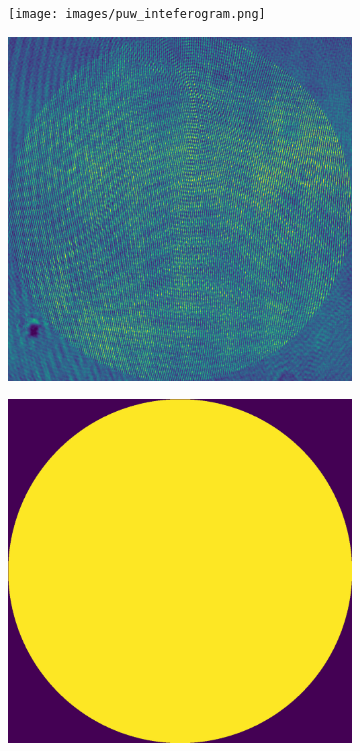 \begin{figure}
	\centering
	\begin{subfigure}{0.23\textwidth}
		\centering
		\texttt{[image: images/puw\_inteferogram.png]}
		\caption{}
		\label{fig:puw_inteferogram}
	\end{subfigure}
	\begin{subfigure}{0.23\textwidth}
		\centering
		\includegraphics[width=1\linewidth, scale=0.5]{images/puw_inteferogram_cropped.png}
		\caption{}
		\label{fig:puw_inteferogram_cropped}
	\end{subfigure}
	\begin{subfigure}{0.23\textwidth}
		\centering
		\includegraphics[width=1\linewidth, scale=0.5]{images/puw_mask.png}

\end{subfigure}
\end{figure}
